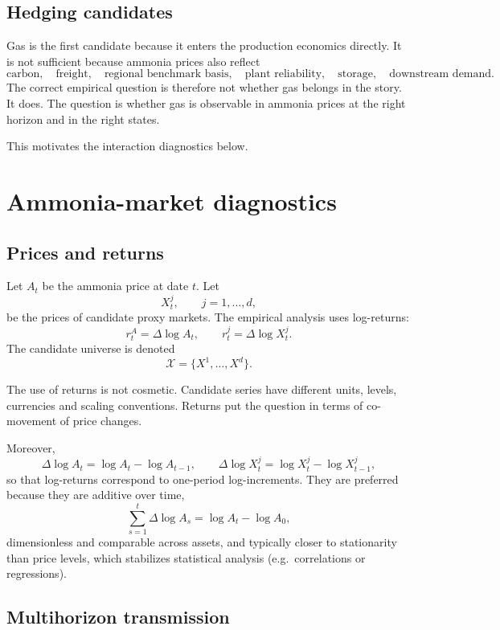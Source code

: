 \documentclass[11pt]{article}
\newcommand{\1}{\mathbf 1}
\begin{document}
\subsection{Hedging candidates}

Gas is the first candidate because it enters the production economics directly. It is not sufficient because ammonia prices also reflect
\[
\text{carbon},
\quad
\text{freight},
\quad
\text{regional benchmark basis},
\quad
\text{plant reliability},
\quad
\text{storage},
\quad
\text{downstream demand}.
\]
The correct empirical question is therefore not whether gas belongs in the story. It does. The question is whether gas is observable in ammonia prices at the right horizon and in the right states.

This motivates the interaction diagnostics below.

\section{Ammonia-market diagnostics}

\subsection{Prices and returns}

Let $A_t$ be the ammonia price at date \(t\). Let
\[
X^j_t,\qquad j=1,\ldots,d,
\]
be the prices of candidate proxy markets. The empirical analysis uses log-returns:
\[
r^A_t
=
\Delta\log A_t,
\qquad
r^j_t
=
\Delta\log X^j_t .
\]
The candidate universe is denoted
\[
\mathcal X
=
\{X^1,\ldots,X^d\}.
\]

The use of returns is not cosmetic. Candidate series have different units, levels, currencies and scaling conventions. Returns put the question in terms of co-movement of price changes.

Moreover,\[\Delta \log A_t = \log A_t - \log A_{t-1},\qquad\Delta \log X^j_t = \log X^j_t - \log X^j_{t-1},\]so that log-returns correspond to one-period log-increments. They are preferred because they are additive over time,\[\sum_{s=1}^t \Delta \log A_s = \log A_t - \log A_0,\]dimensionless and comparable across assets, and typically closer to stationarity than price levels, which stabilizes statistical analysis (e.g.\ correlations or regressions).

\subsection{Multihorizon transmission}
\end{document}
